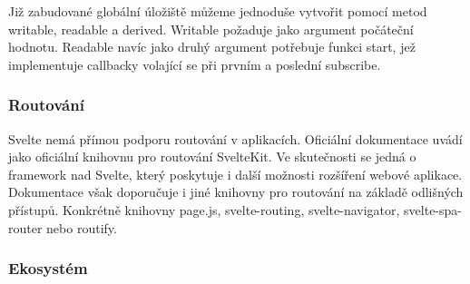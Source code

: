 Již zabudované globální úložiště můžeme jednoduše vytvořit pomocí metod writable, readable a derived. Writable požaduje jako argument počáteční hodnotu. 
Readable navíc jako druhý argument potřebuje funkci start, jež implementuje callbacky volající se při prvním a poslední subscribe.\cite{sveltehandbook,svelte,sveltestatemanagement}

\subsubsection{Routování}

Svelte nemá přímou podporu routování v aplikacích. Oficiální dokumentace uvádí jako oficiální knihovnu pro routování SvelteKit. 
Ve skutečnosti se jedná o framework nad Svelte, který poskytuje i další možnosti rozšíření webové aplikace. 
Dokumentace však doporučuje i jiné knihovny pro routování na základě odlišných přístupů. 
Konkrétně knihovny page.js, svelte-routing, svelte-navigator, svelte-spa-router nebo routify.\cite{svelte,svelteforbeginners}


\subsubsection{Ekosystém}